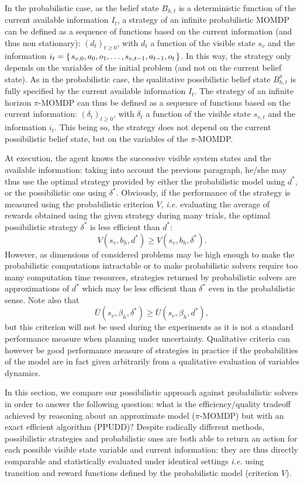 In the probabilistic case, as the belief state $B_{h,t}$ is a deterministic function of the current available information $I_t$,
a strategy of an infinite probabilistic MOMDP can be defined as a sequence of functions based on the current information (and thus non stationary):
$(d_t)_{t\geqslant0}$, with $d_t$ a function of the visible state $s_v$ and the information $i_t = \left\{ \left.  s_{v,0},a_0,o_1, \ldots,s_{v,t-1}, a_{t-1}, o_t  \right. \right\}$.
In this way, the strategy only depends on the variables 
of the initial problem (and not on the current belief state).
As in the probabilistic case, the qualitative possibilistic belief state 
$B^{\pi}_{h,t}$ is fully specified by the current available information $I_t$.
The strategy of an infinite horizon $\pi$-MOMDP can thus be defined 
as a sequence of functions based on the current information:
$(\delta_t)_{t\geqslant0}$, with $\delta_t$ 
a function of the visible state $s_{v,t}$ and the information $i_t$.
This being so, the strategy does not depend on the current possibilistic belief state,
but on the variables of the $\pi$-MOMDP.

At execution, the agent knows the successive visible system states and the available information:
taking into account the previous paragraph,
he/she may thus use the optimal strategy provided by either the probabilistic model using $d^*$, or the possibilistic one using $\delta^*$.
Obviously, if the performance of the strategy is measured using the probabilistic criterion $V$,
\textit{i.e.} evaluating the average of rewards obtained using the given strategy during many trials, 
the optimal possibilistic strategy $\delta^*$ is less efficient than $d^*$: 
\[ V(s_v,b_h,d^*) \geqslant V(s_v,b_h,\delta^*). \]
However, as dimensions of considered problems may be high enough to make the probabilistic computations intractable
or to make probabilistic solvers require too many computation time resources,
strategies returned by probabilistic solvers are approximations of $d^*$ which may be less efficient than $\delta^*$
even in the probabilistic sense.
Note also that
\[ \overline{U}(s_v,\beta_h,\delta^*) \geqslant \overline{U}(s_v,\beta_h,d^*), \]
but this criterion will not be used during the experiments 
as it is not a standard performance measure when planning under uncertainty.
Qualitative criteria can however be good performance measure of strategies in practice 
if the probabilities of the model are in fact given arbitrarily 
from a qualitative evaluation of variables dynamics.

In this section, we compare our possibilistic approach against probabilistic solvers in order
to answer the following question: what is the efficiency/quality tradeoff achieved
by reasoning about an approximate model ($\pi$-MOMDP) but with an exact efficient algorithm (PPUDD)?
Despite radically different methods, possibilistic strategies and probabilistic ones 
are both able to return an action for each possible visible state variable and current information: 
they are thus directly comparable and statistically
evaluated under identical settings 
\textit{i.e.} using transition and reward functions defined by 
the probabilistic model (criterion $V$). 

